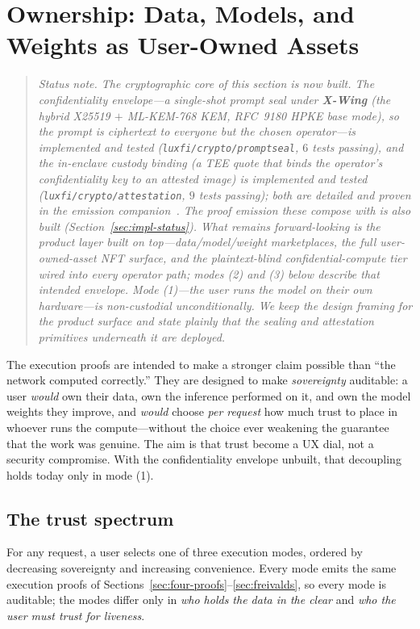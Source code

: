 \section{Ownership: Data, Models, and Weights as User-Owned Assets}
\label{sec:ownership}

\begin{quote}\small\itshape
Status note. The cryptographic core of this section is now built. The confidentiality
envelope---a single-shot prompt seal under \textbf{X-Wing} (the hybrid X25519 $+$
ML-KEM-768 KEM, RFC~9180 HPKE base mode), so the prompt is ciphertext to everyone but the
chosen operator---is implemented and tested (\texttt{luxfi/crypto/promptseal}, $6$ tests
passing), and the in-enclave custody binding (a TEE quote that binds the operator's
confidentiality key to an attested image) is implemented and tested
(\texttt{luxfi/crypto/attestation}, $9$ tests passing); both are detailed and proven in the
emission companion~\cite{poiemission}. The proof emission these compose with is also built
(Section~\ref{sec:impl-status}). What remains forward-looking is the \emph{product} layer
built on top---data/model/weight marketplaces, the full user-owned-asset NFT surface, and
the plaintext-blind confidential-compute tier wired into every operator path; modes (2)
and (3) below describe that intended envelope. Mode (1)---the user runs the model on their
own hardware---is non-custodial unconditionally. We keep the design framing for the product
surface and state plainly that the sealing and attestation primitives underneath it are
deployed.
\end{quote}

The execution proofs are intended to make a stronger claim possible than ``the network
computed correctly.'' They are designed to make \emph{sovereignty} auditable: a user
\emph{would} own their data, own
the inference performed on it, and own the model weights they improve, and \emph{would}
choose
\emph{per request} how much trust to place in whoever runs the compute---without the
choice ever weakening the guarantee that the work was genuine. The aim is that trust
become a UX dial, not a security compromise. With the confidentiality envelope unbuilt,
that decoupling holds today only in mode (1).

\subsection{The trust spectrum}

For any request, a user selects one of three execution modes, ordered by decreasing
sovereignty and increasing convenience. Every mode emits the same execution proofs of
Sections~\ref{sec:four-proofs}--\ref{sec:freivalds}, so every mode is auditable; the
modes differ only in \emph{who holds the data in the clear} and \emph{who the user
must trust for liveness}.

